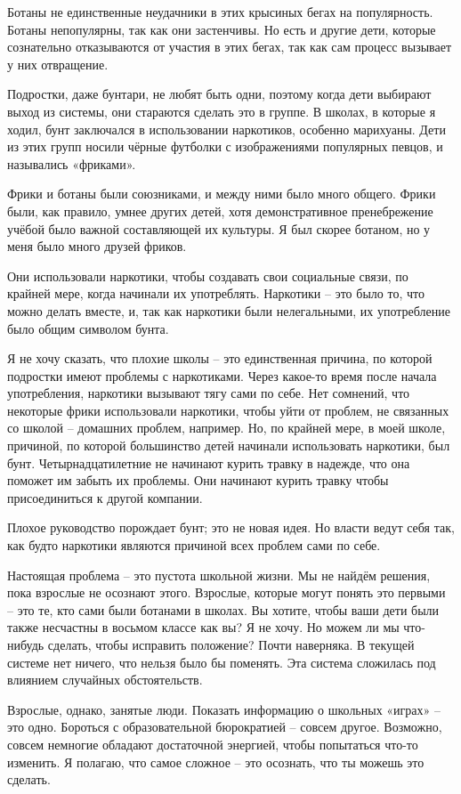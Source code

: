 \documentclass[ebook,12pt,oneside,openany]{memoir}
\begin{document}
Ботаны не единственные неудачники в этих крысиных бегах на
популярность. Ботаны непопулярны, так как они застенчивы. Но есть и
другие дети, которые сознательно отказываются от участия в этих бегах,
так как сам процесс вызывает у них отвращение.

Подростки, даже бунтари, не любят быть одни, поэтому когда дети
выбирают выход из системы, они стараются сделать это в группе. В
школах, в которые я ходил, бунт заключался в использовании наркотиков,
особенно марихуаны. Дети из этих групп носили чёрные футболки с
изображениями популярных певцов, и назывались «фриками».

Фрики и ботаны были союзниками, и между ними было много общего. Фрики
были, как правило, умнее других детей, хотя демонстративное
пренебрежение учёбой было важной составляющей их культуры. Я был
скорее ботаном, но у меня было много друзей фриков.

Они использовали наркотики, чтобы создавать свои социальные связи, по
крайней мере, когда начинали их употреблять. Наркотики – это было то,
что можно делать вместе, и, так как наркотики были нелегальными, их
употребление было общим символом бунта.

Я не хочу сказать, что плохие школы – это единственная причина, по
которой подростки имеют проблемы с наркотиками. Через какое-то время
после начала употребления, наркотики вызывают тягу сами по себе. Нет
сомнений, что некоторые фрики использовали наркотики, чтобы уйти от
проблем, не связанных со школой – домашних проблем, например. Но, по
крайней мере, в моей школе, причиной, по которой большинство детей
начинали использовать наркотики, был бунт. Четырнадцатилетние не
начинают курить травку в надежде, что она поможет им забыть их
проблемы. Они начинают курить травку чтобы присоединиться к другой
компании.

Плохое руководство порождает бунт; это не новая идея. Но власти ведут
себя так, как будто наркотики являются причиной всех проблем сами по
себе.


Настоящая проблема – это пустота школьной жизни. Мы не найдём решения,
пока взрослые не осознают этого. Взрослые, которые могут понять это
первыми – это те, кто сами были ботанами в школах. Вы хотите, чтобы
ваши дети были также несчастны в восьмом классе как вы? Я не хочу. Но
можем ли мы что-нибудь сделать, чтобы исправить положение? Почти
наверняка. В текущей системе нет ничего, что нельзя было бы поменять.
Эта система сложилась под влиянием случайных обстоятельств.

Взрослые, однако, занятые люди. Показать информацию о школьных «играх»
– это одно. Бороться с образовательной бюрократией – совсем другое.
Возможно, совсем немногие обладают достаточной энергией, чтобы
попытаться что-то изменить. Я полагаю, что самое сложное – это
осознать, что ты можешь это сделать.
\end{document}
